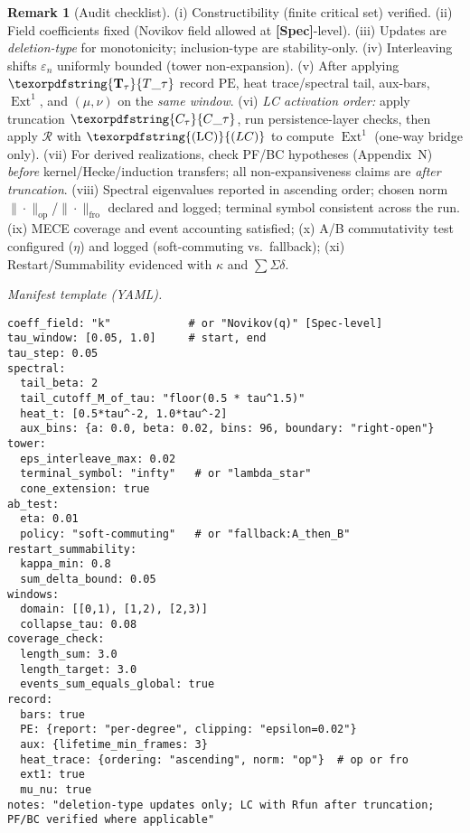 \documentclass[11pt]{article}
\DeclareMathOperator{\Ext}{Ext}
\DeclareRobustCommand{\hyp}{\nobreakdash-}
\newcommand{\Rfun}{\mathcal{R}}
\numberwithin{equation}{section}
\theoremstyle{definition}
\newtheorem{remark}[theorem]{Remark}
\DeclareRobustCommand{\Ttau}{\texorpdfstring{\ensuremath{\mathbf{T}_{\tau}}}{T\_\tau}}
\DeclareRobustCommand{\Ctau}{\texorpdfstring{\ensuremath{C_{\tau}}}{C\_\tau}}
\DeclareRobustCommand{\LC}{\texorpdfstring{\ensuremath{\mathrm{(LC)}}}{(LC)}}
\begin{document}
\begin{remark}[Audit checklist]\label{rk:12-audit}
(i) Constructibility (finite critical set) verified.\;
(ii) Field coefficients fixed (Novikov field allowed at \textbf{[Spec]}\hyp level).\;
(iii) Updates are \emph{deletion\hyp type} for monotonicity; inclusion\hyp type are stability\hyp only.\;
(iv) Interleaving shifts \(\varepsilon_n\) uniformly bounded (tower non\hyp expansion).\;
(v) After applying \(\Ttau\) record \(\mathrm{PE}\), heat trace/spectral tail, aux\hyp bars, \(\Ext^1\), and \((\mu,\nu)\) on the \emph{same window}.\;
(vi) \emph{LC activation order:} apply truncation \(\Ctau\), run persistence\hyp layer checks, then apply \(\Rfun\) with \(\LC\) to compute \(\Ext^1\) (one\hyp way bridge only).\;
(vii) For derived realizations, check PF/BC hypotheses (Appendix~N) \emph{before} kernel/Hecke/induction transfers; all non\hyp expansiveness claims are \emph{after truncation}.\;
(viii) Spectral eigenvalues reported in ascending order; chosen norm \(\|\cdot\|_{\mathrm{op}}\)/\(\|\cdot\|_{\mathrm{fro}}\) declared and logged; terminal symbol consistent across the run.\;
(ix) MECE coverage and event accounting satisfied;\;
(x) A/B commutativity test configured (\(\eta\)) and logged (soft\hyp commuting vs.\ fallback);\;
(xi) Restart/Summability evidenced with \(\kappa\) and \(\sum \Sigma\delta\).
\end{remark}

\noindent\emph{Manifest template (YAML).}
\small
\begin{verbatim}
coeff_field: "k"            # or "Novikov(q)" [Spec-level]
tau_window: [0.05, 1.0]     # start, end
tau_step: 0.05
spectral:
  tail_beta: 2
  tail_cutoff_M_of_tau: "floor(0.5 * tau^1.5)"
  heat_t: [0.5*tau^-2, 1.0*tau^-2]
  aux_bins: {a: 0.0, beta: 0.02, bins: 96, boundary: "right-open"}
tower:
  eps_interleave_max: 0.02
  terminal_symbol: "infty"   # or "lambda_star"
  cone_extension: true
ab_test:
  eta: 0.01
  policy: "soft-commuting"   # or "fallback:A_then_B"
restart_summability:
  kappa_min: 0.8
  sum_delta_bound: 0.05
windows:
  domain: [[0,1), [1,2), [2,3)]
  collapse_tau: 0.08
coverage_check:
  length_sum: 3.0
  length_target: 3.0
  events_sum_equals_global: true
record:
  bars: true
  PE: {report: "per-degree", clipping: "epsilon=0.02"}
  aux: {lifetime_min_frames: 3}
  heat_trace: {ordering: "ascending", norm: "op"}  # op or fro
  ext1: true
  mu_nu: true
notes: "deletion-type updates only; LC with Rfun after truncation; PF/BC verified where applicable"
\end{verbatim}
\normalsize
\end{document}
